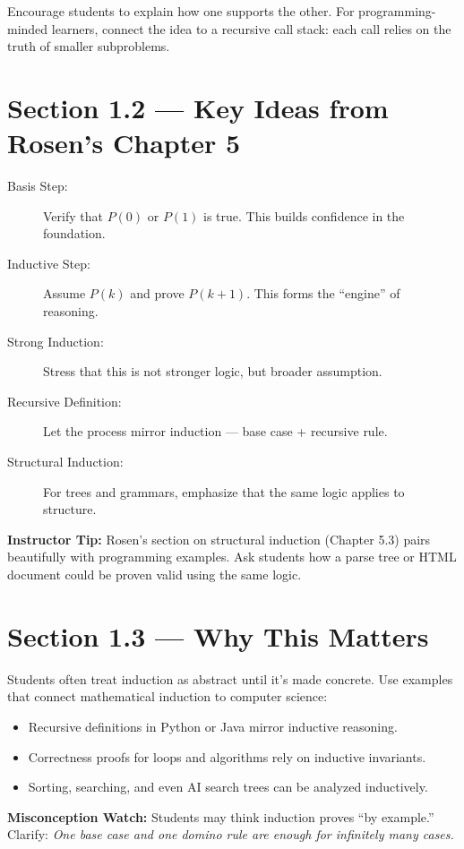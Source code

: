 Encourage students to explain how one supports the other.
For programming-minded learners, connect the idea to a recursive call stack:
each call relies on the truth of smaller subproblems.

\section{Section 1.2 — Key Ideas from Rosen’s Chapter 5}
\begin{description}
  \item[Basis Step:] Verify that $P(0)$ or $P(1)$ is true.  This builds confidence in the foundation.
  \item[Inductive Step:] Assume $P(k)$ and prove $P(k+1)$.  This forms the ``engine'' of reasoning.
  \item[Strong Induction:] Stress that this is not stronger logic, but broader assumption.
  \item[Recursive Definition:] Let the process mirror induction --- base case + recursive rule.
  \item[Structural Induction:] For trees and grammars, emphasize that the same logic applies to structure.
\end{description}

\textbf{Instructor Tip:}
Rosen's section on structural induction (Chapter 5.3) pairs beautifully with programming examples.
Ask students how a parse tree or HTML document could be proven valid using the same logic.

\section{Section 1.3 — Why This Matters}
Students often treat induction as abstract until it’s made concrete.
Use examples that connect mathematical induction to computer science:
\begin{itemize}
  \item Recursive definitions in Python or Java mirror inductive reasoning.
  \item Correctness proofs for loops and algorithms rely on inductive invariants.
  \item Sorting, searching, and even AI search trees can be analyzed inductively.
\end{itemize}

\textbf{Misconception Watch:}
Students may think induction proves “by example.” Clarify:
\textit{One base case and one domino rule are enough for infinitely many cases.}

